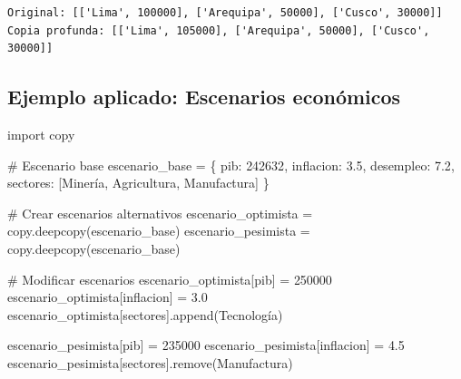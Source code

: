 \documentclass[
  doc,
  floatsintext,
  longtable,
  a4paper,
  nolmodern,
  notxfonts,
  notimes,
  12pt,
  colorlinks=true,linkcolor=blue,citecolor=blue,urlcolor=blue]{apa7}
\newenvironment{Shaded}{\begin{snugshade}}{\end{snugshade}}
\newcommand{\CommentTok}[1]{\textcolor[rgb]{0.37,0.37,0.37}{#1}}
\newcommand{\DecValTok}[1]{\textcolor[rgb]{0.68,0.00,0.00}{#1}}
\newcommand{\FloatTok}[1]{\textcolor[rgb]{0.68,0.00,0.00}{#1}}
\newcommand{\ImportTok}[1]{\textcolor[rgb]{0.00,0.46,0.62}{#1}}
\newcommand{\NormalTok}[1]{\textcolor[rgb]{0.00,0.23,0.31}{#1}}
\newcommand{\OperatorTok}[1]{\textcolor[rgb]{0.37,0.37,0.37}{#1}}
\newcommand{\StringTok}[1]{\textcolor[rgb]{0.13,0.47,0.30}{#1}}
\begin{document}
\begin{verbatim}
Original: [['Lima', 100000], ['Arequipa', 50000], ['Cusco', 30000]]
Copia profunda: [['Lima', 105000], ['Arequipa', 50000], ['Cusco', 30000]]
\end{verbatim}

\subsection{Ejemplo aplicado: Escenarios
económicos}\label{ejemplo-aplicado-escenarios-econuxf3micos}

\begin{Shaded}
\begin{Highlighting}[]
\ImportTok{import}\NormalTok{ copy}

\CommentTok{\# Escenario base}
\NormalTok{escenario\_base }\OperatorTok{=}\NormalTok{ \{}
    \StringTok{\textquotesingle{}pib\textquotesingle{}}\NormalTok{: }\DecValTok{242632}\NormalTok{,}
    \StringTok{\textquotesingle{}inflacion\textquotesingle{}}\NormalTok{: }\FloatTok{3.5}\NormalTok{,}
    \StringTok{\textquotesingle{}desempleo\textquotesingle{}}\NormalTok{: }\FloatTok{7.2}\NormalTok{,}
    \StringTok{\textquotesingle{}sectores\textquotesingle{}}\NormalTok{: [}\StringTok{\textquotesingle{}Minería\textquotesingle{}}\NormalTok{, }\StringTok{\textquotesingle{}Agricultura\textquotesingle{}}\NormalTok{, }\StringTok{\textquotesingle{}Manufactura\textquotesingle{}}\NormalTok{]}
\NormalTok{\}}

\CommentTok{\# Crear escenarios alternativos}
\NormalTok{escenario\_optimista }\OperatorTok{=}\NormalTok{ copy.deepcopy(escenario\_base)}
\NormalTok{escenario\_pesimista }\OperatorTok{=}\NormalTok{ copy.deepcopy(escenario\_base)}

\CommentTok{\# Modificar escenarios}
\NormalTok{escenario\_optimista[}\StringTok{\textquotesingle{}pib\textquotesingle{}}\NormalTok{] }\OperatorTok{=} \DecValTok{250000}
\NormalTok{escenario\_optimista[}\StringTok{\textquotesingle{}inflacion\textquotesingle{}}\NormalTok{] }\OperatorTok{=} \FloatTok{3.0}
\NormalTok{escenario\_optimista[}\StringTok{\textquotesingle{}sectores\textquotesingle{}}\NormalTok{].append(}\StringTok{\textquotesingle{}Tecnología\textquotesingle{}}\NormalTok{)}

\NormalTok{escenario\_pesimista[}\StringTok{\textquotesingle{}pib\textquotesingle{}}\NormalTok{] }\OperatorTok{=} \DecValTok{235000}
\NormalTok{escenario\_pesimista[}\StringTok{\textquotesingle{}inflacion\textquotesingle{}}\NormalTok{] }\OperatorTok{=} \FloatTok{4.5}
\NormalTok{escenario\_pesimista[}\StringTok{\textquotesingle{}sectores\textquotesingle{}}\NormalTok{].remove(}\StringTok{\textquotesingle{}Manufactura\textquotesingle{}}\NormalTok{)}


\end{Highlighting}
\end{Shaded}
\end{document}
